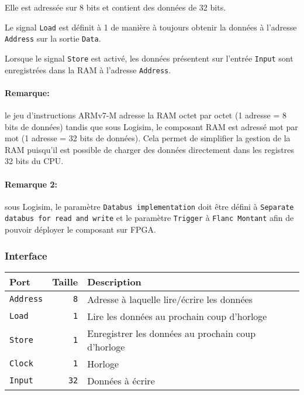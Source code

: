 \documentclass{article}
\begin{document}
    Elle est adressée sur 8 bits et contient des données de 32 bits.

    Le signal \texttt{Load} est définit à 1 de manière à toujours obtenir la données à l'adresse \texttt{Address} sur la sortie \texttt{Data}.

    Lorsque le signal \texttt{Store} est activé, les données présentent sur l'entrée \texttt{Input} sont enregistrées dans la RAM à l'adresse \texttt{Address}.

    \paragraph{Remarque:} le jeu d'instructions ARMv7-M adresse la RAM octet par octet (1 adresse = 8 bits de données) tandis que sous Logisim, le composant RAM est adressé mot par mot (1 adresse = 32 bits de données).
    Cela permet de simplifier la gestion de la RAM puisqu'il est possible de charger des données directement dans les registres 32 bits du CPU.

    \paragraph{Remarque 2:} sous Logisim, le paramètre \texttt{Databus implementation} doit être défini à \texttt{Separate databus for read and write}
    et le paramètre \texttt{Trigger} à \texttt{Flanc Montant} afin de pouvoir déployer le composant sur FPGA.

    \subsubsection{Interface}


    \begin{tabular}{|l|r|l|}
        \hline
        \textbf{Port}    & \textbf{Taille} & \textbf{Description}                               \\
        \hline

        \texttt{Address} & \texttt{8}      & Adresse à laquelle lire/écrire les données         \\
        \hline
        \texttt{Load}    & \texttt{1}      & Lire les données au prochain coup d'horloge        \\
        \hline
        \texttt{Store}   & \texttt{1}      & Enregistrer les données au prochain coup d'horloge \\
        \hline
        \texttt{Clock}   & \texttt{1}      & Horloge                                            \\
        \hline
        \texttt{Input}   & \texttt{32}     & Données à écrire                                   \\


        \hline
    \end{tabular}
\end{document}
